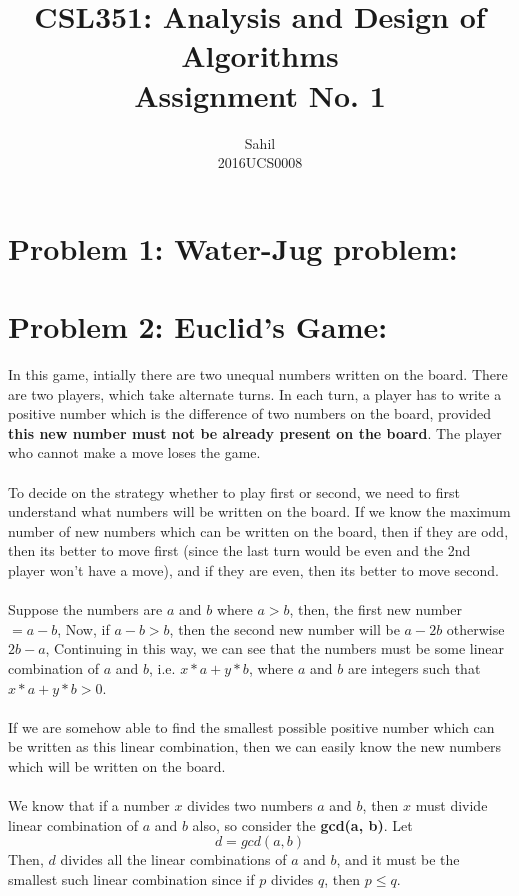 \documentclass[12pt]{report}
\title{\centering CSL351: Analysis and Design of Algorithms \\Assignment No. 1}
\author{\LARGE Sahil\\2016UCS0008}
\begin{document}
\maketitle

\section{Problem 1: Water-Jug problem:}

\section{Problem 2: Euclid's Game:}
In this game, intially there are two unequal numbers written on the board. There are two players, which take alternate turns. In each turn, a player has to write a positive number which is the difference of two numbers on the board, provided \textbf{this new number must not be already present on the board}. The player who cannot make a move loses the game. 
\\ \\ 
To decide on the strategy whether to play first or second, we need to first understand what numbers will be written on the board. If we know the maximum number of new numbers which can be written on the board, then if they are odd, then its better to move first (since the last turn would be even and the 2nd player won't have a move), and if they are even, then its better to move second. 
\\ \\
Suppose the numbers are $a$ and $b$ where $a > b$, then, the first new number $= a - b$, Now, if $a - b > b$, then the second new number will be $a - 2b$ otherwise $2b - a$, Continuing in this way, we can see that the numbers must be some linear combination of $a$ and $b$, i.e. $x*a + y*b$, where  $a$ and $b$ are integers such that $x*a + y*b > 0$.
\\ \\
If we are somehow able to find the smallest possible positive number which can be written as this linear combination, then we can easily know the new numbers which will be written on the board. 
\\ \\
We know that if a number $x$ divides two numbers $a$ and $b$, then $x$ must divide linear combination of $a$ and $b$ also, so consider the \textbf{gcd(a, b)}. Let 
\[ d = gcd(a, b) \]
Then, $d$ divides all the linear combinations of $a$ and $b$, and it must be the smallest such linear combination since if $p$ divides $q$, then $ p \leq q$. 
\end{document}

